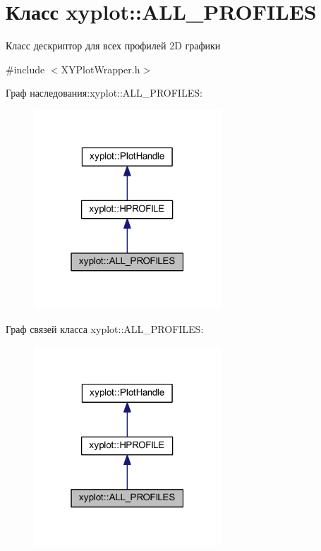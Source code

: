 \hypertarget{classxyplot_1_1_a_l_l___p_r_o_f_i_l_e_s}{\section{Класс xyplot\-:\-:A\-L\-L\-\_\-\-P\-R\-O\-F\-I\-L\-E\-S}
\label{classxyplot_1_1_a_l_l___p_r_o_f_i_l_e_s}
}


Класс дескриптор для всех профилей 2\-D графики  




{\ttfamily \#include $<$X\-Y\-Plot\-Wrapper.\-h$>$}



Граф наследования\-:xyplot\-:\-:A\-L\-L\-\_\-\-P\-R\-O\-F\-I\-L\-E\-S\-:\nopagebreak
\begin{figure}[H]
\begin{center}
\leavevmode
\includegraphics[width=199pt]{classxyplot_1_1_a_l_l___p_r_o_f_i_l_e_s__inherit__graph}
\end{center}
\end{figure}


Граф связей класса xyplot\-:\-:A\-L\-L\-\_\-\-P\-R\-O\-F\-I\-L\-E\-S\-:\nopagebreak
\begin{figure}[H]
\begin{center}
\leavevmode
\includegraphics[width=199pt]{classxyplot_1_1_a_l_l___p_r_o_f_i_l_e_s__coll__graph}
\end{center}
\end{figure}
